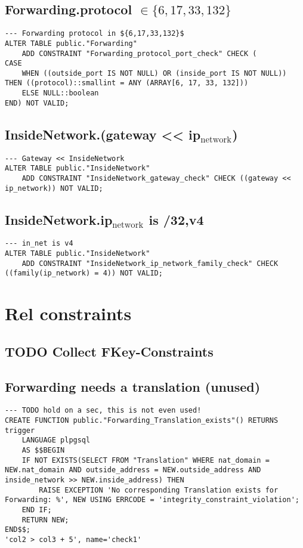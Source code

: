 \documentclass[11pt]{article}
\begin{document}
\subsection{Forwarding.protocol \(\in \{6, 17, 33, 132\}\)}
\label{sec:org5c3463b}
\begin{verbatim}
--- Forwarding protocol in ${6,17,33,132}$
ALTER TABLE public."Forwarding"
    ADD CONSTRAINT "Forwarding_protocol_port_check" CHECK (
CASE
    WHEN ((outside_port IS NOT NULL) OR (inside_port IS NOT NULL)) THEN ((protocol)::smallint = ANY (ARRAY[6, 17, 33, 132]))
    ELSE NULL::boolean
END) NOT VALID;
\end{verbatim}

\subsection{InsideNetwork.(gateway << ip\(_{\text{network}}\))}
\label{sec:org57041dc}
\begin{verbatim}
--- Gateway << InsideNetwork
ALTER TABLE public."InsideNetwork"
    ADD CONSTRAINT "InsideNetwork_gateway_check" CHECK ((gateway << ip_network)) NOT VALID;
\end{verbatim}

\subsection{InsideNetwork.ip\(_{\text{network}}\) is /32,v4}
\label{sec:org94a6dad}
\begin{verbatim}
--- in_net is v4
ALTER TABLE public."InsideNetwork"
    ADD CONSTRAINT "InsideNetwork_ip_network_family_check" CHECK ((family(ip_network) = 4)) NOT VALID;
\end{verbatim}


\section{Rel constraints}
\label{sec:org14c8af7}
\subsection{{\bfseries\sffamily TODO} Collect FKey-Constraints}
\label{sec:org1ec613f}
\subsection{Forwarding needs a translation (unused)}
\label{sec:org42dac99}
\begin{verbatim}
--- TODO hold on a sec, this is not even used!
CREATE FUNCTION public."Forwarding_Translation_exists"() RETURNS trigger
    LANGUAGE plpgsql
    AS $$BEGIN
	IF NOT EXISTS(SELECT FROM "Translation" WHERE nat_domain = NEW.nat_domain AND outside_address = NEW.outside_address AND inside_network >> NEW.inside_address) THEN
		RAISE EXCEPTION 'No corresponding Translation exists for Forwarding: %', NEW USING ERRCODE = 'integrity_constraint_violation';
	END IF;
	RETURN NEW;
END$$;
'col2 > col3 + 5', name='check1'
\end{verbatim}
\end{document}
